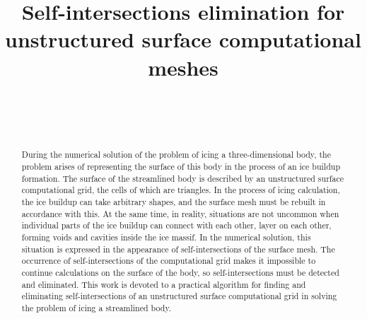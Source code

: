 \documentclass[
11pt,%
tightenlines,%
twoside,%
onecolumn,%
nofloats,%
nobibnotes,%
nofootinbib,%
superscriptaddress,%
noshowpacs,%
centertags]%
{revtex4}
\begin{document}

\title{Self-intersections elimination for unstructured surface computational meshes}

\author{~}

\author{~}



\begin{abstract}
During the numerical solution of the problem of icing a three-dimensional body, the problem arises of representing the surface of this body in the process of an ice buildup formation.
The surface of the streamlined body is described by an unstructured surface computational grid, the cells of which are triangles.
In the process of icing calculation, the ice buildup can take arbitrary shapes, and the surface mesh must be rebuilt in accordance with this.
At the same time, in reality, situations are not uncommon when individual parts of the ice buildup can connect with each other, layer on each other, forming voids and cavities inside the ice massif.
In the numerical solution, this situation is expressed in the appearance of self-intersections of the surface mesh.
The occurrence of self-intersections of the computational grid makes it impossible to continue calculations on the surface of the body, so self-intersections must be detected and eliminated.
This work is devoted to a practical algorithm for finding and eliminating self-intersections of an unstructured surface computational grid in solving the problem of icing a streamlined body.
\end{abstract}


\end{document}
